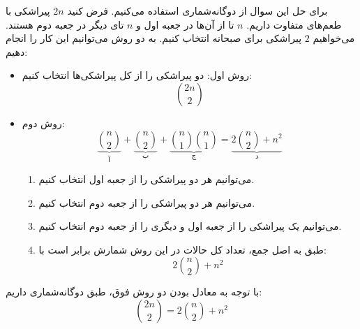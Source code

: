 \p
برای حل این سوال از دوگانه‌شماری استفاده می‌کنیم. فرض کنید 
$2n$
پیراشکی با طعم‌های متفاوت داریم. 
$n$
تا از آن‌ها در جعبه اول و 
$n$
تای دیگر در جعبه دوم هستند. می‌خواهیم 
$2$
پیراشکی برای صبحانه انتخاب کنیم. به دو روش می‌توانیم این کار را انجام دهیم:
\begin{itemize}
\item
روش اول:
 دو پیراشکی را از کل پیراشکی‌ها انتخاب کنیم:
 $$\binom{2n}{2}$$

\item
روش دوم:
$$\underbrace{\binom{n}{2}}_{\text{آ}} + \underbrace{\binom{n}{2}}_{\text{ب}}  + \underbrace{\binom{n}{1}\binom{n}{1}}_{\text{ج}} = \underbrace{2\binom{n}{2} + n^2}_{\text{د}}$$
\begin{enumerate}
\item 
می‌توانیم هر دو پیراشکی را از جعبه اول انتخاب کنیم.

\item
می‌توانیم هر دو پیراشکی را از جعبه دوم انتخاب کنیم.

\item
می‌توانیم یک پیراشکی را از جعبه اول و دیگری را از جعبه دوم انتخاب کنیم.

\item
 طبق به اصل جمع، تعداد کل حالات در این روش شمارش برابر است با:
$$2\binom{n}{2} + n^2$$
\end{enumerate}
\end{itemize}

\p
با توجه به معادل بودن دو روش فوق، طبق دوگانه‌شماری داریم:
$$\binom{2n}{2} = 2\binom{n}{2} + n^2$$